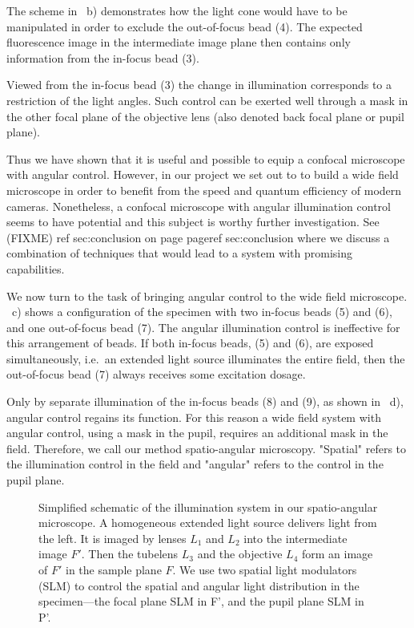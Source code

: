 The scheme in ~b) demonstrates how
the light cone would have to be manipulated in order to exclude the out-of-focus
bead (4). The expected fluorescence image in the
intermediate image plane then contains only information from the
in-focus bead (3).

Viewed from the in-focus bead (3) the change in illumination
corresponds to a restriction of the light angles. Such control can be
exerted well through a mask in the other focal plane of the objective
lens (also denoted back focal plane or pupil plane).

Thus we have shown that it is useful and possible to equip a confocal
microscope with angular control. However, in our project we set out to
to build a wide field microscope in order to benefit from the speed
and quantum efficiency of modern cameras.  Nonetheless, a confocal
microscope with angular illumination control seems to have potential
and this subject is worthy further investigation.  See (FIXME) ref
sec:conclusion on page pageref sec:conclusion where we discuss a
combination of techniques that would lead to a system with promising capabilities.

We now turn to the task of bringing angular control to the wide field
microscope. ~c) shows a configuration of the
specimen with two in-focus beads (5) and (6), and one out-of-focus
bead (7).  The angular illumination control is ineffective for this
arrangement of beads.  If both in-focus beads, (5) and (6), are exposed
simultaneously, i.e.\ an extended light source illuminates the entire field,
then the out-of-focus bead (7) always receives some excitation dosage.

Only by separate illumination of the in-focus beads (8)
and (9), as shown in ~d), angular control
regains its function. For this reason a wide field system with angular
control, using a mask in the pupil, requires an additional mask in the
field.  Therefore, we call our method spatio-angular
microscopy. "Spatial" refers to the illumination control in the field
and "angular" refers to the control in the pupil plane.


\begin{figure}[!hbt]
  \centering
  \caption{Simplified schematic of the illumination system in our
    spatio-angular microscope. A homogeneous extended light source
    delivers light from the left. It is imaged by lenses $L_1$ and $L_2$ into
    the intermediate image $F'$. Then the tubelens $L_3$ and the
    objective $L_4$ form an image of $F'$ in the sample plane $F$. We
    use two spatial light modulators (SLM) to control the spatial and angular
light distribution in the specimen---the focal plane SLM in F', and the pupil plane SLM in
    P'.}
  \label{fig:memi-simple}
\end{figure}

